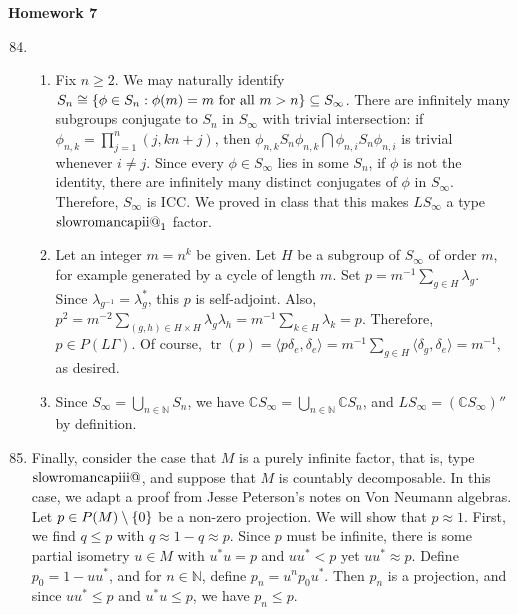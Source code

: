 \documentclass[a4paper,10pt]{report}
\makeatletter
\newcommand{\ggen}[1]{\langle#1\rangle}
\DeclarePairedDelimiter{\set}{\{}{\}}
\newcommand{\N}{\mathbb{N}}
\newcommand{\C}{\mathbb{C}}
\DeclareMathOperator{\tr}{tr}
\newcommand{\Romnum}[1]{\expandafter\@slowromancap\romannumeral #1@}
\newcommand{\factor}[1]{\text{\Romnum{#1}}}
\makeatother
\begin{document}

\pagestyle{fancy}	
\fancyhf{} %
\setlength{\headheight}{60pt}

\begin{center}
	\textbf{Homework 7}
\end{center}

\begin{enumerate}
		\setcounter{enumi}{83}
 \item 
		\begin{enumerate}
			\item Fix $n\ge 2$. We may naturally identify $S_n\cong\set{\phi\in S_n:\phi(m)=m\text{ for all }m>n}\subseteq S_\infty$. There are infinitely many subgroups conjugate to $S_n$ in $S_\infty$ with trivial intersection: if $\phi_{n,k}=\prod_{j=1}^n(j,kn+j)$, then $\phi_{n,k}S_n\phi_{n,k}\bigcap\phi_{n,i}S_n\phi_{n,i}$ is trivial whenever $i\neq j$. Since every $\phi\in S_\infty$ lies in some $S_n$, if $\phi$ is not the identity, there are infinitely many distinct conjugates of $\phi$ in $S_\infty$. Therefore, $S_\infty$ is ICC. We proved in class that this makes $LS_\infty$ a type $\factor{2}_1$ factor. 
			\item Let an integer $m=n^k$ be given. Let $H$ be a subgroup of $S_\infty$ of order $m$, for example generated by a cycle of length $m$. Set $p=m^{-1}\sum_{g\in H}\lambda_g$. Since $\lambda_{g^{-1}}=\lambda_g^*$, this $p$ is self-adjoint. Also, $p^2=m^{-2}\sum_{(g,h)\in H\times H}\lambda_g\lambda_h=m^{-1}\sum_{k\in H}\lambda_k=p$. Therefore, $p\in P(L\Gamma)$. Of course, $\tr(p)=\ggen{p\delta_e,\delta_e}=m^{-1}\sum_{g\in H}\ggen{\delta_g,\delta_e}=m^{-1}$, as desired. 
			\item Since $S_\infty=\bigcup_{n\in\N}S_n$, we have $\C S_\infty=\bigcup_{n\in\N}\C S_n$, and $LS_\infty=(\C S_\infty)''$ by definition. 
		\end{enumerate}
		\setcounter{enumi}{85}
 \item 

		Finally, consider the case that $M$ is a purely infinite factor, that is, type $\factor{3}$, and suppose that $M$ is countably decomposable. In this case, we adapt a proof from Jesse Peterson's notes on Von Neumann algebras. Let $p\in P(M)\setminus\set{0}$ be a non-zero projection. We will show that $p\approx 1$. First, we find $q\le p$ with $q\approx 1-q\approx p$. Since $p$ must be infinite, there is some partial isometry $u\in M$ with $u^*u=p$ and $uu^*<p$ yet $uu^*\approx p$. Define $p_0=1-uu^*$, and for $n\in\N$, define $p_n=u^np_0u^*$. Then $p_n$ is a projection, and since $uu^*\le p$ and $u^*u\le p$, we have $p_n\le p$. 
		

\end{enumerate}
\end{document}
